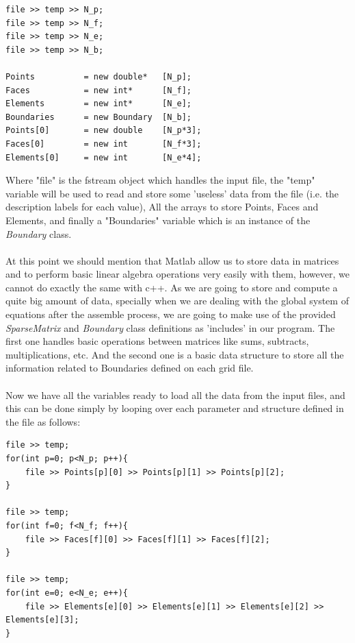 \documentclass[12pt]{article}
\begin{document}
\begin{lstlisting}[style=MyC++Style]
file >> temp >> N_p;
file >> temp >> N_f;
file >> temp >> N_e;
file >> temp >> N_b;

Points			= new double*	[N_p];
Faces			= new int*		[N_f];
Elements		= new int*		[N_e];
Boundaries		= new Boundary  [N_b];
Points[0]       = new double    [N_p*3];
Faces[0]        = new int       [N_f*3];
Elements[0]     = new int       [N_e*4];
\end{lstlisting}

Where "file" is the fstream object which handles the input file, the "temp" variable will be used to read and store some 'useless' data from the file (i.e. the description labels for each value), All the arrays to store Points, Faces and Elements, and finally a "Boundaries" variable which is an instance of the \textit{Boundary} class. 
\\\\
At this point we should mention that Matlab allow us to store data in matrices and to perform basic linear algebra operations very easily with them, however, we cannot do exactly the same with c++. As we are going to store and compute a quite big amount of data, specially when we are dealing with the global system of equations after the assemble process, we are going to make use of the provided \textit{SparseMatrix} and \textit{Boundary} class definitions as 'includes' in our program. The first one handles basic operations between matrices like sums, subtracts, multiplications, etc. And the second one is a basic data structure to store all the information related to Boundaries defined on each grid file. 
\\\\

Now we have all the variables ready to load all the data from the input files, and this can be done simply by looping over each parameter and structure defined in the file as follows:

\begin{lstlisting}[style=MyC++Style]
file >> temp;
for(int p=0; p<N_p; p++){
	file >> Points[p][0] >> Points[p][1] >> Points[p][2];
}

file >> temp;
for(int f=0; f<N_f; f++){
	file >> Faces[f][0] >> Faces[f][1] >> Faces[f][2];
}

file >> temp;
for(int e=0; e<N_e; e++){
	file >> Elements[e][0] >> Elements[e][1] >> Elements[e][2] >> Elements[e][3];
}
\end{lstlisting}
\end{document}
